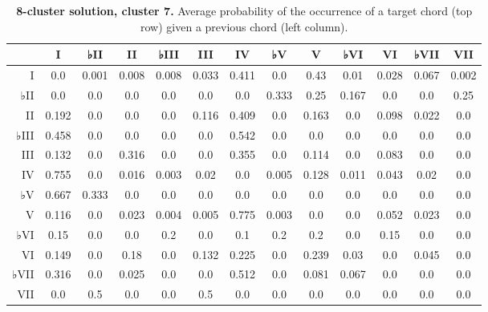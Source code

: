 \begin{table}[htbp]
\begin{minipage}{\linewidth}
\setlength{\tymax}{0.5\linewidth}
\centering
\small
\caption{\textbf{8-cluster solution, cluster 7.} Average probability of the occurrence of a target chord (top row) given a previous chord (left column).}
\label{8-clustersolutioncluster7.averageprobabilityoftheoccurrenceofatargetchordtoprowgivenapreviouschordleftcolumn.}
\begin{tabulary}{\textwidth}{@{}RCCCCCCCCCCCC@{}} \toprule
&I&♭II&II&♭III&III&IV&♭V&V&♭VI&VI&♭VII&VII\\
\midrule
I&0.0&0.001&0.008&0.008&0.033&0.411&0.0&0.43&0.01&0.028&0.067&0.002\\
♭II&0.0&0.0&0.0&0.0&0.0&0.0&0.333&0.25&0.167&0.0&0.0&0.25\\
II&0.192&0.0&0.0&0.0&0.116&0.409&0.0&0.163&0.0&0.098&0.022&0.0\\
♭III&0.458&0.0&0.0&0.0&0.0&0.542&0.0&0.0&0.0&0.0&0.0&0.0\\
III&0.132&0.0&0.316&0.0&0.0&0.355&0.0&0.114&0.0&0.083&0.0&0.0\\
IV&0.755&0.0&0.016&0.003&0.02&0.0&0.005&0.128&0.011&0.043&0.02&0.0\\
♭V&0.667&0.333&0.0&0.0&0.0&0.0&0.0&0.0&0.0&0.0&0.0&0.0\\
V&0.116&0.0&0.023&0.004&0.005&0.775&0.003&0.0&0.0&0.052&0.023&0.0\\
♭VI&0.15&0.0&0.0&0.2&0.0&0.1&0.2&0.2&0.0&0.15&0.0&0.0\\
VI&0.149&0.0&0.18&0.0&0.132&0.225&0.0&0.239&0.03&0.0&0.045&0.0\\
♭VII&0.316&0.0&0.025&0.0&0.0&0.512&0.0&0.081&0.067&0.0&0.0&0.0\\
VII&0.0&0.5&0.0&0.0&0.5&0.0&0.0&0.0&0.0&0.0&0.0&0.0\\

\bottomrule

\end{tabulary}
\end{minipage}
\end{table}

